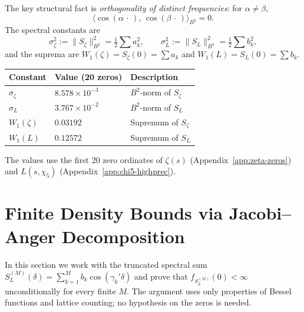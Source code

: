 \documentclass[12pt,reqno]{amsart}
\theoremstyle{plain}
\theoremstyle{definition}
\theoremstyle{remark}
\begin{document}
The key structural fact is \emph{orthogonality of distinct frequencies}: for $\alpha \neq \beta$,
\begin{equation}\label{eq:orthog}
  \langle \cos(\alpha\,\cdot\,),\, \cos(\beta\,\cdot\,)\rangle_{B^2} = 0.
\end{equation}
The spectral constants are
\[
  \sigma_\zeta^2 := \|S_\zeta\|_{B^2}^2 = \tfrac{1}{2}\sum a_k^2, \qquad
  \sigma_L^2 := \|S_L\|_{B^2}^2 = \tfrac{1}{2}\sum b_k^2,
\]
and the suprema are $W_1(\zeta) = S_\zeta(0) = \sum a_k$ and $W_1(L) = S_L(0) = \sum b_k$.

\begin{center}
\renewcommand{\arraystretch}{1.2}
\begin{tabular}{lll}
\toprule
Constant & Value (20 zeros) & Description \\
\midrule
$\sigma_\zeta$ & $8.578 \times 10^{-3}$ & $B^2$-norm of $S_\zeta$ \\
$\sigma_L$ & $3.767 \times 10^{-2}$ & $B^2$-norm of $S_L$ \\
$W_1(\zeta)$ & $0.03192$ & Supremum of $S_\zeta$ \\
$W_1(L)$ & $0.12572$ & Supremum of $S_L$ \\
\bottomrule
\end{tabular}
\end{center}
The values use the first 20 zero ordinates of $\zeta(s)$ (Appendix~\ref{app:zeta-zeros}) and $L(s,\chi_5)$ (Appendix~\ref{app:chi5-highprec}).

\section{Finite Density Bounds via Jacobi--Anger Decomposition}\label{sec:finite}

In this section we work with the truncated spectral sum $S_L^{(M)}(\delta) = \sum_{k=1}^M b_k\cos(\gamma_k'\delta)$ and prove that $f_{S_L^{(M)}}(0) < \infty$ unconditionally for every finite $M$.  The argument uses only properties of Bessel functions and lattice counting; no hypothesis on the zeros is needed.
\end{document}
